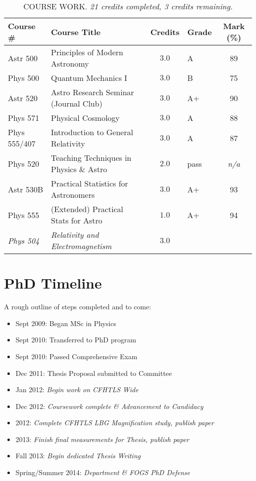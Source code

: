 \documentclass{article}
\begin{document}
\begin{table*}[b!]
 \begin{center}
   
    \begin{tabular}{|l|l|c|l|c|}
      \hline
      Course \# & Course Title & Credits & Grade & Mark (\%) \\ \hline \hline
      Astr 500 & Principles of Modern Astronomy & $3.0$ & A  & 89 \\ \hline
      Phys 500 & Quantum Mechanics I & $3.0$ & B & 75 \\ \hline
      Astr 520 & Astro Research Seminar (Journal Club) & $3.0$ & A+ & 90 \\ \hline
      Phys 571 & Physical Cosmology & $3.0$ & A & 88 \\ \hline
      Phys 555/407 & Introduction to General Relativity & $3.0$ & A & 87 \\ \hline
      Phys 520 & Teaching Techniques in Physics \& Astro & $2.0$ & pass & \it{n/a} \\ \hline
      Astr 530B & Practical Statistics for Astronomers & $3.0$ & A+ & 93 \\ \hline
      Phys 555 & (Extended) Practical Stats for Astro & $1.0$ & A+ & 94 \\ \hline
      \it{Phys 504} & \it{Relativity and Electromagnetism} & \it{$3.0$} &  & \\ \hline

    \end{tabular}
  
  \caption{COURSE WORK. \it{21 credits completed, 3 credits remaining.}}
  \label{marks}
 \end{center}
\end{table*}


\section{PhD Timeline}
A rough outline of steps completed and to come:

\begin{itemize}
 \item{Sept 2009: Began MSc in Physics}
 \item{Sept 2010: Transferred to PhD program}
 \item{Sept 2010: Passed Comprehensive Exam}
 \item{Dec 2011: Thesis Proposal submitted to Committee}
 \item{Jan 2012: {\it Begin work on CFHTLS Wide}}
 \item{Dec 2012: {\it Coursework complete \& Advancement to Candidacy}}
 \item{2012: {\it Complete CFHTLS LBG Magnification study, publish paper}}
 \item{2013: {\it Finish final measurements for Thesis, publish paper}}
 \item{Fall 2013: {\it Begin dedicated Thesis Writing}}
 \item{Spring/Summer 2014: {\it Department \& FOGS PhD Defense}}

\end{itemize}
\end{document}
